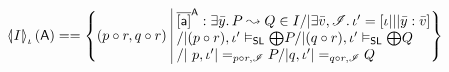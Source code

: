%
%
\begin{definition}\label{def:interference-semantics}
\begin{align*}
  \semI[\lenv]{I}(\token{A}) &==
  \left\{
  \begin{array}{@{}l@{\ }|@{\ }r@{}}
    (p \composeL r, q \composeL r)&
    \begin{array}{@{}l@{}}
      \interAss{\overline{[\token{a}]}^{\token{A}}}{\bar{y}}{P}{Q} \in I /|  \exsts{\bar{v}, \lmod} \lenv' = [\lenv|||\bar y:\bar v] \\
      /| (p \composeL r), \lenv'\slsat \sumA{P} 
      /| (q \composeL r), \lenv' \slsat \sumA{Q} \\
      /|\ p, \lenv' |=_{p \composeL r, \lmod} P 
      /| q, \lenv' |=_{q \composeL r, \lmod} Q 
    \end{array}
  \end{array}
  \right\}
  \end{align*}
\end{definition}
%
%
%
